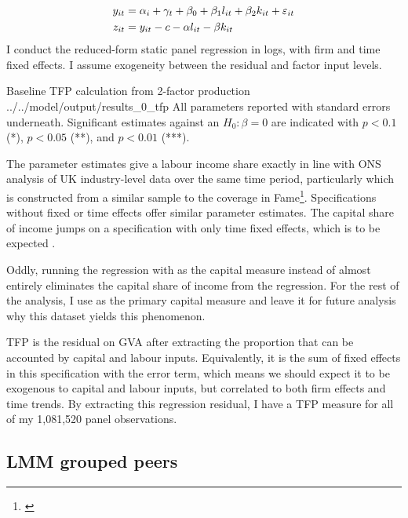 \begin{align}
    \label{eqn:tfp2factor}
    y_{it} &= \alpha_i + \gamma_t + \beta_0 + \beta_1 l_{it} + \beta_2 k_{it} + \varepsilon_{it}
    \\ \notag
    z_{it} &= y_{it} - c - \alpha l_{it} - \beta k_{it}
\end{align}
%
I conduct the reduced-form static panel regression in logs,
with firm and time fixed effects. I assume exogeneity between the residual and factor input levels.

\wraptable
    {Baseline TFP calculation from 2-factor production}
    {../../model/output/results_0_tfp}
    {
        All parameters reported with standard errors underneath.
        Significant estimates against an $H_0: \beta=0$ are indicated
        with $p<0.1$ (*), $p<0.05$ (**), and $p<0.01$ (***).
    }

The parameter estimates give a labour income share exactly in line with ONS analysis of UK industry-level data
over the same time period, particularly  which is constructed
from a similar sample to the coverage in Fame\footnote{\cite{OfficeforNationalStatistics2024}}.
Specifications without fixed or time effects offer similar parameter estimates.
The capital share of income jumps on a specification with only time fixed effects,
which is to be expected .

Oddly, running the regression with  as the capital measure instead of 
almost entirely eliminates the capital share of income from the regression.
For the rest of the analysis, I use  as the primary capital measure
and leave it for future analysis why this dataset yields this phenomenon.

TFP is the residual on GVA after extracting the proportion that can be accounted by capital and labour inputs.
Equivalently, it is the sum of fixed effects in this specification with the error term,
which means we should expect it to be exogenous to capital and labour inputs,
but correlated to both firm effects and time trends.
By extracting this regression residual, I have a TFP measure for all of my 1,081,520 panel observations.


\subsection{LMM grouped peers}
\label{ss:model-lmm}

